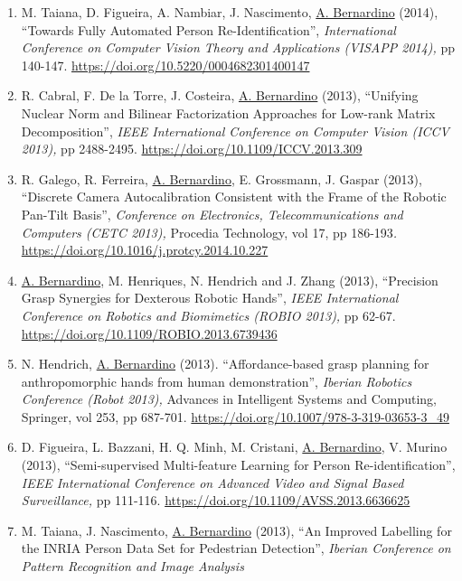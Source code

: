 \begin{enumerate}
{  Bernardino}, J. Santos-Victor, P. Trahanias (2014), ``A Framework for
  3D Object Identification and Tracking'', \emph{International
  Conference on Computer Vision Theory and Applications (VISAPP 2014),}
  pp 672-677. \url{https://doi.org/10.5220/0004751506720677}
\item
  M. Taiana, D. Figueira, A. Nambiar, J. Nascimento, \ul{A. Bernardino}
  (2014), ``Towards Fully Automated Person Re-Identification'',
  \emph{International Conference on Computer Vision Theory and
  Applications (VISAPP 2014),} pp 140-147.
  \url{https://doi.org/10.5220/0004682301400147}
\item
  R. Cabral, F. De la Torre, J. Costeira, \ul{A. Bernardino} (2013),
  ``Unifying Nuclear Norm and Bilinear Factorization Approaches for
  Low-rank Matrix Decomposition'', \emph{IEEE International Conference
  on Computer Vision (ICCV 2013),} pp 2488-2495.
  \url{https://doi.org/10.1109/ICCV.2013.309}~
\item
  R. Galego, R. Ferreira, \ul{A. Bernardino}, E. Grossmann, J. Gaspar
  (2013), ``Discrete Camera Autocalibration Consistent with the Frame of
  the Robotic Pan-Tilt Basis'', \emph{Conference on Electronics,
  Telecommunications and Computers (CETC 2013),} Procedia Technology,
  vol 17, pp 186-193\emph{.}
  \url{https://doi.org/10.1016/j.protcy.2014.10.227}~
\item
  \ul{A. Bernardino}, M. Henriques, N. Hendrich and J. Zhang (2013),
  ``Precision Grasp Synergies for Dexterous Robotic Hands'', \emph{IEEE
  International Conference on Robotics and Biomimetics (ROBIO 2013),} pp
  62-67. \url{https://doi.org/10.1109/ROBIO.2013.6739436}
\item
  N. Hendrich, \ul{A. Bernardino} (2013). ``Affordance-based grasp
  planning for anthropomorphic hands from human demonstration'',
  \emph{Iberian Robotics Conference (Robot 2013),} Advances in
  Intelligent Systems and Computing, Springer, vol 253, pp 687-701.
  \url{https://doi.org/10.1007/978-3-319-03653-3_49}~
\item
  D. Figueira, L. Bazzani, H. Q. Minh, M. Cristani, \ul{A. Bernardino},
  V. Murino (2013), ``Semi-supervised Multi-feature Learning for Person
  Re-identification'', \emph{IEEE International Conference on Advanced
  Video and Signal Based Surveillance,} pp 111-116.
  \url{https://doi.org/10.1109/AVSS.2013.6636625}~
\item
  M. Taiana, J. Nascimento, \ul{A. Bernardino} (2013), ``An Improved
  Labelling for the INRIA Person Data Set for Pedestrian Detection'',
  \emph{Iberian Conference on Pattern Recognition and Image Analysis
}
\end{enumerate}
